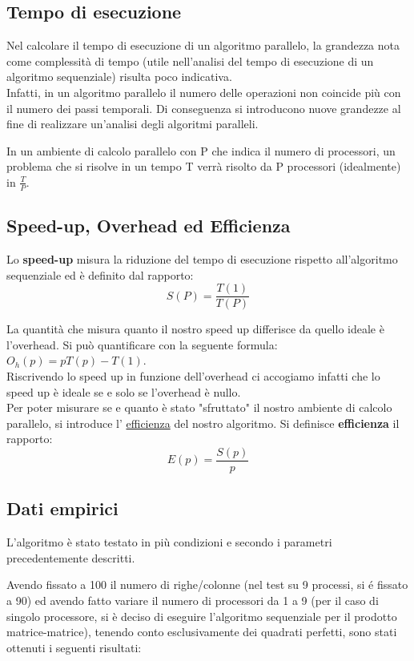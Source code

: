\subsection{Tempo di esecuzione}

Nel calcolare il tempo di esecuzione di un algoritmo parallelo, la grandezza nota come complessità di tempo (utile nell'analisi del tempo di esecuzione di un algoritmo sequenziale) risulta poco indicativa.\\
Infatti, in un algoritmo parallelo il numero delle operazioni non coincide più con il numero dei passi temporali. Di conseguenza si introducono nuove grandezze al fine di realizzare un'analisi degli algoritmi paralleli.

In un ambiente di calcolo parallelo con P che indica il numero di processori, un problema che si risolve in un tempo T verrà risolto da P processori (idealmente) in $\frac{T}{P}$.


\subsection{Speed-up, Overhead ed Efficienza}

Lo \textbf{speed-up} misura la riduzione del tempo di esecuzione rispetto all'algoritmo sequenziale ed è definito dal rapporto:
$$ S(P) = \frac{T(1)}{T(P)} $$ 


La quantità che misura quanto il nostro speed up differisce da quello ideale è l'overhead. Si può quantificare con la seguente formula: $O_h(p) = pT(p) - T(1)$.\\
Riscrivendo lo speed up in funzione dell'overhead ci accogiamo infatti che lo speed up è ideale se e solo se l'overhead è nullo.\\

Per poter misurare se e quanto è stato "sfruttato" il nostro ambiente di calcolo parallelo, si introduce l' \underline{efficienza} del nostro algoritmo.
Si definisce \textbf{efficienza} il rapporto: $$ E(p) = \frac{S(p)}{p} $$

\subsection{Dati empirici}
L'algoritmo è stato testato in più condizioni e secondo i parametri precedentemente descritti.

Avendo fissato a 100 il numero di righe/colonne (nel test su 9 processi, si é fissato a 90) ed avendo fatto variare il numero di processori da 1 a 9 (per il caso di singolo processore, si è deciso di eseguire l'algoritmo sequenziale per il prodotto matrice-matrice), tenendo conto esclusivamente dei quadrati perfetti, sono stati ottenuti i seguenti risultati:

